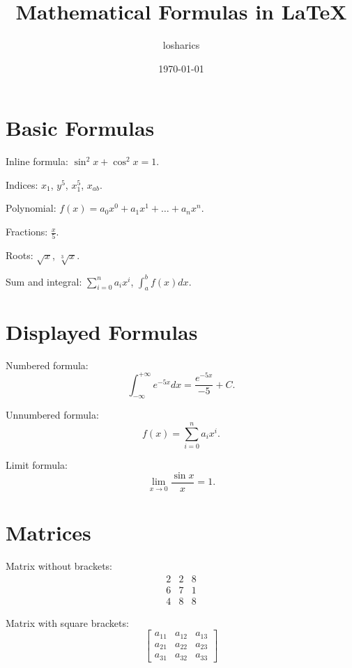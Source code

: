\documentclass{article}
\begin{document}
\title{Mathematical Formulas in \LaTeX}
\author{losharics}
\date{\today}
\maketitle

\section{Basic Formulas}

Inline formula: $\sin^2 x + \cos^2 x = 1$.

Indices: $x_1$, $y^5$, $x_1^5$, $x_{ab}$.

Polynomial: $f(x) = a_0 x^0 + a_1 x^1 + \dots + a_n x^n$.

Fractions: $\frac{x}{5}$.

Roots: $\sqrt{x}$, $\sqrt[3]{x}$.

Sum and integral: $\sum_{i=0}^n a_i x^i$, $\int_{a}^{b} f(x) dx$.

\section{Displayed Formulas}

Numbered formula:
\begin{equation}
\int_{-\infty}^{+\infty} e^{-5x} dx = \frac{e^{-5x}}{-5} + C.
\end{equation}

Unnumbered formula:
\begin{equation*}
f(x) = \sum_{i=0}^n a_i x^i.
\end{equation*}

Limit formula:
\begin{equation*}
\lim_{x \to 0} \frac{\sin x}{x} = 1.
\end{equation*}

\section{Matrices}

Matrix without brackets:
\begin{equation*}
\begin{matrix}
2 & 2 & 8 \\
6 & 7 & 1 \\
4 & 8 & 8
\end{matrix}
\end{equation*}

Matrix with square brackets:
\begin{equation*}
\begin{bmatrix}
a_{11} & a_{12} & a_{13} \\
a_{21} & a_{22} & a_{23} \\
a_{31} & a_{32} & a_{33}
\end{bmatrix}
\end{equation*}
\end{document}
